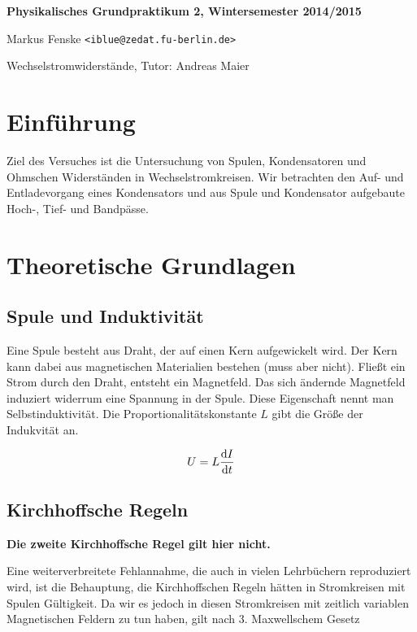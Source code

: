\documentclass[a4paper,german,12pt,smallheadings]{scrartcl}
\begin{document}
\allowdisplaybreaks %
\begin{center}
\bfseries %
\sffamily %
\vspace{-40pt}
Physikalisches Grundpraktikum 2, Wintersemester 2014/2015

Markus Fenske \texttt{<iblue@zedat.fu-berlin.de>}

Wechselstromwiderstände, Tutor: Andreas Maier
\vspace{-10pt}
\end{center}
\section{Einführung}
Ziel des Versuches ist die Untersuchung von Spulen, Kondensatoren und Ohmschen
Widerständen in Wechselstromkreisen. Wir betrachten den Auf- und Entladevorgang
eines Kondensators und aus Spule und Kondensator aufgebaute Hoch-, Tief- und
Bandpässe.

\section{Theoretische Grundlagen}

\subsection{Spule und Induktivität}

Eine Spule besteht aus Draht, der auf einen Kern aufgewickelt wird. Der Kern
kann dabei aus magnetischen Materialien bestehen (muss aber nicht). Fließt ein
Strom durch den Draht, entsteht ein Magnetfeld. Das sich ändernde Magnetfeld
induziert widerrum eine Spannung in der Spule. Diese Eigenschaft nennt man
Selbstinduktivität. Die Proportionalitätskonstante $L$ gibt die Größe der
Indukvität an.

\begin{equation}
  U = L \frac{\dif I}{\dif t}
\end{equation}

\subsection{Kirchhoffsche Regeln}

\textbf{Die zweite Kirchhoffsche Regel gilt hier nicht.}

Eine weiterverbreitete Fehlannahme, die auch in vielen Lehrbüchern reproduziert
wird, ist die Behauptung, die Kirchhoffschen Regeln hätten in Stromkreisen mit
Spulen Gültigkeit. Da wir es jedoch in diesen Stromkreisen mit zeitlich
variablen Magnetischen Feldern zu tun haben, gilt nach 3. Maxwellschem Gesetz
\end{document}
